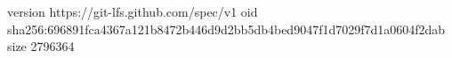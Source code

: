 version https://git-lfs.github.com/spec/v1
oid sha256:696891fca4367a121b8472b446d9d2bb5db4bed9047f1d7029f7d1a0604f2dab
size 2796364
